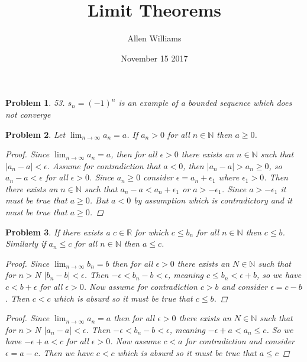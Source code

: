 \documentclass{article}
\title{Limit Theorems}
\author{Allen Williams }
\date{November 15 2017}
\newtheorem*{Problem}{Problem}
\begin{document}
\maketitle

\begin{Problem}
 53. $s_n=(-1)^n$ is an example of a bounded sequence which does not converge
\end{Problem}

\begin{Problem}
  Let $\lim_{n\to\infty}a_n=a$. If $a_n>0$ for all $n\in\mathbb{N}$ then $a\geq 0$.
  \begin{proof}
  Since $\lim_{n\to\infty}a_n=a$, then for all $\epsilon>0$ there exists an $n\in\mathbb{N}$ such that $\lvert a_n-a\rvert<\epsilon$.  Assume for contradiction that $a<0$, then $\lvert a_n-a\rvert > a_n \geq0$, so $a_n-a<\epsilon$ for all $\epsilon>0$.  Since $a_n\geq0$ consider $\epsilon=a_n+\epsilon_1$ where $\epsilon_1>0$.  Then there exists an $n\in\mathbb{N}$ such that $a_n-a<a_n+\epsilon_1$ or $a>-\epsilon_1$.  Since $a>-\epsilon_1$ it must be true that $a\geq0$.  But $a<0$ by assumption which is contradictory and it must be true that $a\geq 0$.
  \end{proof}
\end{Problem}
\begin{Problem}
   If there exists a $c\in\mathbb{R}$ for which $c\leq b_n$ for all $n\in\mathbb{N}$ then $c\leq b$.  Similarly if $a_n\leq c$ for all $n\in\mathbb{N}$ then $a\leq c$.
   \begin{proof}
   Since $\lim_{n\to\infty}b_n=b$ then for all $\epsilon>0$ there exists an $N\in\mathbb{N}$ such that for $n>N$ $\lvert b_n-b\rvert<\epsilon$.  Then $-\epsilon<b_n-b<\epsilon$, meaning $c\leq b_n<\epsilon+b$, so we have $c<b+\epsilon$ for all $\epsilon>0$.  Now assume for contradiction $c>b$ and consider $\epsilon = c-b$.  Then $c<c$ which is absurd so it must be true that $c\leq b$.
   \end{proof}
   \begin{proof}
   Since $\lim_{n\to\infty}a_n=a$ then for all $\epsilon>0$ there exists an $N\in\mathbb{N}$ such that for $n>N$ $\lvert a_n-a\rvert<\epsilon$.  Then $-\epsilon<b_n-b<\epsilon$, meaning $-\epsilon+a<a_n\leq c$.  So we have $-\epsilon +a<c$ for all $\epsilon>0$.  Now assume $c<a$ for contradiction and consider $\epsilon=a-c$.  Then we have $c<c$ which is absurd so it must be true that $a\leq c$
   \end{proof}
\end{Problem}
\end{document}
